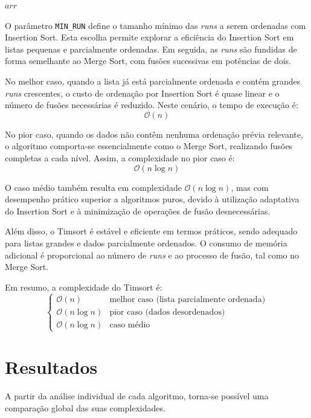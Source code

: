 \documentclass[conference]{IEEEtran}
\begin{document}
\begin{algorithm}[H]
\begin{algorithmic}[1]
            \State \Return $arr$
        \EndFunction
    
        \State {}
    \end{algorithmic}
\end{algorithm}

O parâmetro \texttt{MIN\_RUN} define o tamanho mínimo das \textit{runs} a serem ordenadas com Insertion Sort. Esta escolha permite explorar a eficiência do Insertion Sort em listas pequenas e parcialmente ordenadas. Em seguida, as \textit{runs} são fundidas de forma semelhante ao Merge Sort, com fusões sucessivas em potências de dois.

No melhor caso, quando a lista já está parcialmente ordenada e contém grandes \textit{runs} crescentes, o custo de ordenação por Insertion Sort é quase linear e o número de fusões necessárias é reduzido. Neste cenário, o tempo de execução é:
\[
\mathcal{O}(n)
\]

No pior caso, quando os dados não contêm nenhuma ordenação prévia relevante, o algoritmo comporta-se essencialmente como o Merge Sort, realizando fusões completas a cada nível. Assim, a complexidade no pior caso é:
\[
\mathcal{O}(n \log n)
\]

O caso médio também resulta em complexidade \(\mathcal{O}(n \log n)\), mas com desempenho prático superior a algoritmos puros, devido à utilização adaptativa do Insertion Sort e à minimização de operações de fusão desnecessárias.

Além disso, o Timsort é estável e eficiente em termos práticos, sendo adequado para listas grandes e dados parcialmente ordenados. O consumo de memória adicional é proporcional ao número de \textit{runs} e ao processo de fusão, tal como no Merge Sort.

Em resumo, a complexidade do Timsort é:
\[
\begin{cases}
\mathcal{O}(n) & \text{melhor caso (lista parcialmente ordenada)} \\
\mathcal{O}(n \log n) & \text{pior caso (dados desordenados)} \\
\mathcal{O}(n \log n) & \text{caso médio}
\end{cases}
\]

\section{Resultados}

A partir da análise individual de cada algoritmo, torna-se possível uma comparação global das suas complexidades.
\end{document}
